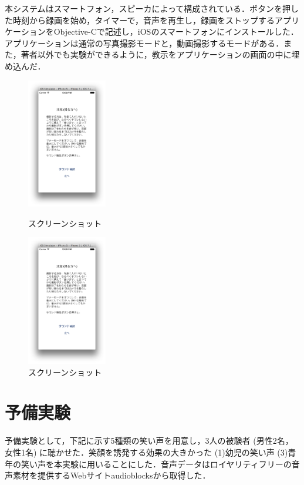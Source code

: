 \documentclass[submit,techreq]{ec2014}
\begin{document}
本システムはスマートフォン，スピーカによって構成されている．ボタンを押した時刻から録画を始め，タイマーで，音声を再生し，録画をストップするアプリケーションをObjective-Cで記述し，iOSのスマートフォンにインストールした．アプリケーションは通常の写真撮影モードと，動画撮影するモードがある．また，著者以外でも実験ができるように，教示をアプリケーションの画面の中に埋め込んだ．
\begin{figure}[h]
\begin{minipage}{0.49\columnwidth}
\begin{center}
\includegraphics[width=35mm, bb=0 0 434 704]{images/ss/ss1.png}
\caption{スクリーンショット}
\end{center}
\end{minipage}
\begin{minipage}{0.49\columnwidth}
\begin{center}
\includegraphics[width=35mm, bb=0 0 434 704]{images/ss/ss1.png}
\caption{スクリーンショット}
\end{center}
\end{minipage}
\end{figure}

\section{予備実験}

予備実験として，下記に示す5種類の笑い声を用意し，3人の被験者 (男性2名，女性1名) に聴かせた．笑顔を誘発する効果の大きかった (1)幼児の笑い声 (3)青年の笑い声を本実験に用いることにした．音声データはロイヤリティフリーの音声素材を提供するWebサイトaudioblocksから取得した．
\end{document}
